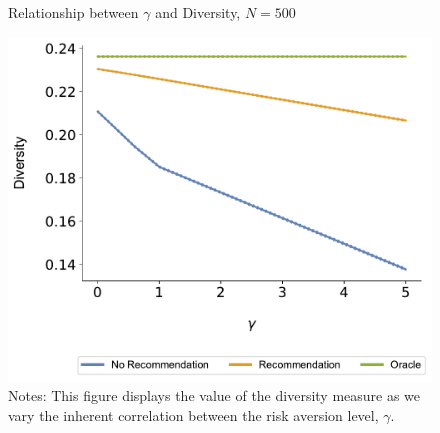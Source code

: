 \documentclass[format=acmsmall, review=true]{acmart}
\begin{document}
\begin{figure}[ht]
\caption{Relationship between $\gamma$ and Diversity, $N = 500$}
\includegraphics[width=.45\linewidth]{figures/gamma_diversity_N_500_T_20}
\caption*{\scriptsize Notes: This figure displays the value of the diversity measure as we vary the inherent correlation between the risk aversion level, $\gamma$.}\label{fig:cor_homo}
\end{figure}
\end{document}
